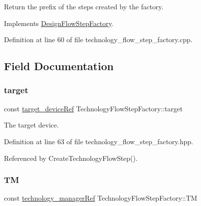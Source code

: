 Return the prefix of the steps created by the factory. 



Implements \hyperlink{classDesignFlowStepFactory_a52abfc00c170b5a63e84431b75eb698e}{Design\+Flow\+Step\+Factory}.



Definition at line 60 of file technology\+\_\+flow\+\_\+step\+\_\+factory.\+cpp.



\subsection{Field Documentation}
\mbox{\label{classTechnologyFlowStepFactory_a798bf9e7a0e488fb3ede977df87feb1c}} 
\subsubsection{\texorpdfstring{target}{target}}
{\footnotesize\ttfamily const \hyperlink{target__device_8hpp_acedb2b7a617e27e6354a8049fee44eda}{target\+\_\+device\+Ref} Technology\+Flow\+Step\+Factory\+::target\hspace{0.3cm}{\ttfamily [protected]}}



The target device. 



Definition at line 63 of file technology\+\_\+flow\+\_\+step\+\_\+factory.\+hpp.



Referenced by Create\+Technology\+Flow\+Step().

\mbox{\label{classTechnologyFlowStepFactory_ab515494e57323a3f703c670bf75bb84c}} 
\subsubsection{\texorpdfstring{TM}{TM}}
{\footnotesize\ttfamily const \hyperlink{technology__manager_8hpp_a4b9ecd440c804109c962654f9227244e}{technology\+\_\+manager\+Ref} Technology\+Flow\+Step\+Factory\+::\+TM\hspace{0.3cm}{\ttfamily [protected]}}



